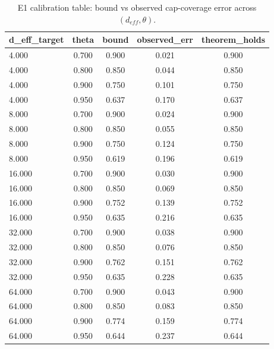 \begin{table}[t]
\centering
\small
\caption{E1 calibration table: bound vs observed cap-coverage error across $(d_{eff}, \theta)$.}
\label{tab:c1_calib}
\begin{tabular}{lcccc}
\toprule
d\_eff\_target & theta & bound & observed\_err & theorem\_holds \\
\midrule
4.000 & 0.700 & 0.900 & 0.021 & 0.900 \\
4.000 & 0.800 & 0.850 & 0.044 & 0.850 \\
4.000 & 0.900 & 0.750 & 0.101 & 0.750 \\
4.000 & 0.950 & 0.637 & 0.170 & 0.637 \\
8.000 & 0.700 & 0.900 & 0.024 & 0.900 \\
8.000 & 0.800 & 0.850 & 0.055 & 0.850 \\
8.000 & 0.900 & 0.750 & 0.124 & 0.750 \\
8.000 & 0.950 & 0.619 & 0.196 & 0.619 \\
16.000 & 0.700 & 0.900 & 0.030 & 0.900 \\
16.000 & 0.800 & 0.850 & 0.069 & 0.850 \\
16.000 & 0.900 & 0.752 & 0.139 & 0.752 \\
16.000 & 0.950 & 0.635 & 0.216 & 0.635 \\
32.000 & 0.700 & 0.900 & 0.038 & 0.900 \\
32.000 & 0.800 & 0.850 & 0.076 & 0.850 \\
32.000 & 0.900 & 0.762 & 0.151 & 0.762 \\
32.000 & 0.950 & 0.635 & 0.228 & 0.635 \\
64.000 & 0.700 & 0.900 & 0.043 & 0.900 \\
64.000 & 0.800 & 0.850 & 0.083 & 0.850 \\
64.000 & 0.900 & 0.774 & 0.159 & 0.774 \\
64.000 & 0.950 & 0.644 & 0.237 & 0.644 \\
\bottomrule
\end{tabular}
\end{table}
